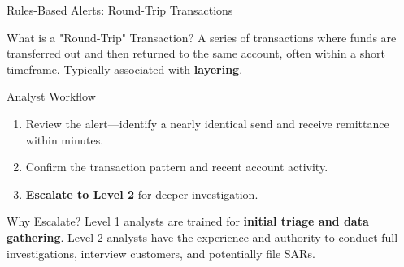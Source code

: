 \documentclass{beamer}
\begin{document}
	\begin{frame}{Rules-Based Alerts: Round-Trip Transactions}
		\begin{block}{What is a "Round-Trip" Transaction?}
			A series of transactions where funds are transferred out and then returned to the same account, often within a short timeframe. Typically associated with \textbf{layering}.
		\end{block}
		\begin{block}{Analyst Workflow}
			\begin{enumerate}
				\item Review the alert—identify a nearly identical send and receive remittance within minutes.
				\item Confirm the transaction pattern and recent account activity.
				\item \textbf{Escalate to Level 2} for deeper investigation.
			\end{enumerate}
		\end{block}
		\begin{alertblock}{Why Escalate?}
			Level 1 analysts are trained for \textbf{initial triage and data gathering}. Level 2 analysts have the experience and authority to conduct full investigations, interview customers, and potentially file SARs.
		\end{alertblock}
	\end{frame}
	
\end{document}

